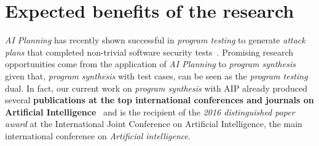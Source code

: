 \documentclass[10pt,a4paper]{paper}
\begin{document}
\section{Expected benefits of the research}
\label{subsec:beneficios}
{\em AI Planning} has recently shown successful in {\em program testing} to generate {\em attack plans} that completed non-trivial software security tests~\cite{hoffmann2015simulated,steinmetz2016revisiting,shmaryahu2016constructing,steinmetz2016goal}. Promising research opportunities come from the application of {\em AI Planning} to {\em program synthesis} given that, {\em program synthesis} with test cases, can be seen as the {\em program testing} dual. In fact, our current work on {\em program synthesis} with AIP already produced several {\bf publications at the top international conferences and journals on Artificial Intelligence}~\cite{segovia2017generating,sergio:aprogramingb:ijcai16,sergio:aprograming:ijcai16,sergio:aprograming:icaps16,segovia:FSC:JAIR2018,segovia:programs:AIJ19} and is the recipient of the {\it 2016 distinguished paper award} at the International Joint Conference on Artificial Intelligence, the main international conference on {\em Artificial intelligence}. 
\end{document}
